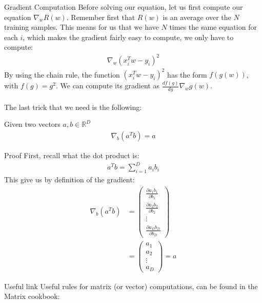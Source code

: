 	
	\begin{parag}{Gradient Computation}
		Before solving our equation, let us first compute our equation $\nabla_w R\left(w\right)$. Remember first that $R\left(w\right)$ is an average over the $N$ training samples. This means for us that we have $N$ times the same equation for each $i$, which makes the gradient fairly easy to compute, we only have to compute:
		\begin{align*} 
			\nabla_w \left(x_i^Tw - y_i\right)^2
		\end{align*}
		By using the chain rule, the function $\left(x_i^Tw - y_i\right)^2$ has the form $f\left(g\left(w\right)\right)$, with $f\left(g\right) =  g^2$. We can compute its gradient as $\frac{df\left(g\right)}{dg} \nabla_w g\left(w\right)$.\\
		$ $\\
		The last trick that we need is the following:
		\begin{theoreme}
		Given two vectors $a, b \in \mathbb{R}^{D}$
		\begin{align*} 
			\nabla_b\left(a^Tb\right) =  a
		\end{align*}
		\end{theoreme}
		\begin{subparag}{Proof}
		    First, recall what the dot product is:
			\begin{align*} 
				a^{T}b =  \sum_{i= 1}^{D}a_ib_i
			\end{align*}
			This give us by definition of the gradient:
			\begin{align*} 
				\nabla_b\left(a^{T}b\right) &= \begin{pmatrix} \frac{\partial a_1b_1}{\partial b_1}  \\ \frac{\partial a_2b_2}{\partial b_2}  \\ \vdots \\ \frac{\partial a_Db_D}{\partial b_D}  \end{pmatrix} \\
				&= \begin{pmatrix} a_1 \\ a_2 \\ \vdots \\ a_D \end{pmatrix} = a
			\end{align*}
		\end{subparag}
		\begin{subparag}{Useful link}
		    Useful rules for matrix (or vector) computations, can be found in the Matrix cookbook:
			\begin{center}

\end{center}
\end{subparag}
\end{parag}
